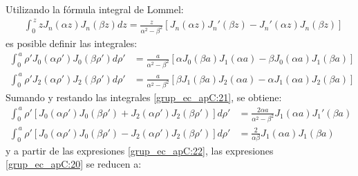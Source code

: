 Utilizando la fórmula integral de Lommel:
\begin{align}
&\int_{0}^{\,z}\!zJ_n\!\left(\alpha z\right)\!J_n\!\left(\beta z\right)dz = \frac{z}{\alpha^2 - \beta^2}\left[J_n\!\left(\alpha z\right)\!{J_n}'\!\left(\beta z\right) - {J_n}'\!\left(\alpha z\right)\!J_n\!\left(\beta z\right)\right]
\label{ec_apC:93}
\end{align}
es posible definir las integrales:
\begin{subequations}
\label{grup_ec_apC:21}
\begin{align}
\int_{0}^{\,a}\!\rho 'J_0\!\left(\alpha\rho '\right)\!J_0\!\left(\beta\rho '\right)d\rho ' &= \frac{a}{\alpha^2 - \beta^2}\left[\alpha J_0\!\left(\beta a\right)\!J_1\!\left(\alpha a\right) - \beta J_0\!\left(\alpha a\right)\!J_1\!\left(\beta a\right)\right]
\label{ec_apC:94}\\
\int_{0}^{\,a}\!\rho 'J_2\!\left(\alpha\rho '\right)\!J_2\!\left(\beta\rho '\right)d\rho ' &= \frac{a}{\alpha^2 - \beta^2}\left[\beta J_1\!\left(\beta a\right)\!J_2\!\left(\alpha a\right) - \alpha J_1\!\left(\alpha a\right)\!J_2\!\left(\beta a\right)\right]
\label{ec_apC:95}
\end{align}
\end{subequations}
Sumando y restando las integrales \eqref{grup_ec_apC:21}, se obtiene:
\begin{subequations}
\label{grup_ec_apC:22}
\begin{align}
\int_{0}^{\,a}\!\rho '\!\left[J_0\!\left(\alpha\rho '\right)\!J_0\!\left(\beta\rho '\right) + J_2\!\left(\alpha\rho '\right)\!J_2\!\left(\beta\rho '\right)\right]d\rho ' &= \frac{2\alpha a}{\alpha^2 - \beta^2}J_1\!\left(\alpha a\right)\!{J_1}'\!\left(\beta a\right)
\label{ec_apC:96}\\
\int_{0}^{\,a}\!\rho '\!\left[J_0\!\left(\alpha\rho '\right)\!J_0\!\left(\beta\rho '\right) - J_2\!\left(\alpha\rho '\right)\!J_2\!\left(\beta\rho '\right)\right]d\rho ' &= \frac{2}{\alpha \beta}J_1\!\left(\alpha a\right)\!J_1\!\left(\beta a\right)
\label{ec_apC:97}
\end{align}
\end{subequations}
y a partir de las expresiones \eqref{grup_ec_apC:22}, las expresiones \eqref{grup_ec_apC:20} se reducen a:
